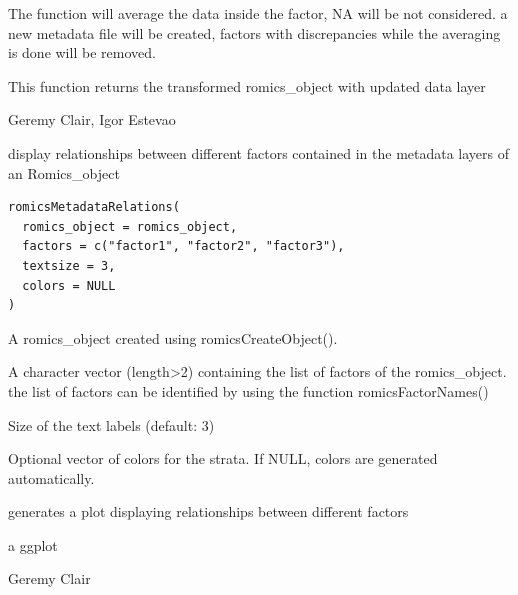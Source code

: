 \documentclass[a4paper]{book}
\begin{document}
%
\begin{Details}
The function will average the data inside the factor, NA will be not considered. a new metadata file will be created, factors with discrepancies while the averaging is done will be removed.
\end{Details}
%
\begin{Value}
This function returns the transformed romics\_object with updated data layer
\end{Value}
%
\begin{Author}
Geremy Clair, Igor Estevao
\end{Author}
%
\begin{Description}
display relationships between different factors contained in the metadata layers of an Romics\_object
\end{Description}
%
\begin{Usage}
\begin{verbatim}
romicsMetadataRelations(
  romics_object = romics_object,
  factors = c("factor1", "factor2", "factor3"),
  textsize = 3,
  colors = NULL
)
\end{verbatim}
\end{Usage}
%
\begin{Arguments}
\begin{ldescription}
\item[\code{romics\_object}] A romics\_object created using romicsCreateObject().

\item[\code{factors}] A character vector (length>2) containing the list of factors of the romics\_object. the list of factors can be identified by using the function romicsFactorNames()

\item[\code{textsize}] Size of the text labels (default: 3)

\item[\code{colors}] Optional vector of colors for the strata. If NULL, colors are generated automatically.
\end{ldescription}
\end{Arguments}
%
\begin{Details}
generates a plot displaying relationships between different factors
\end{Details}
%
\begin{Value}
a ggplot
\end{Value}
%
\begin{Author}
Geremy Clair
\end{Author}
\end{document}
